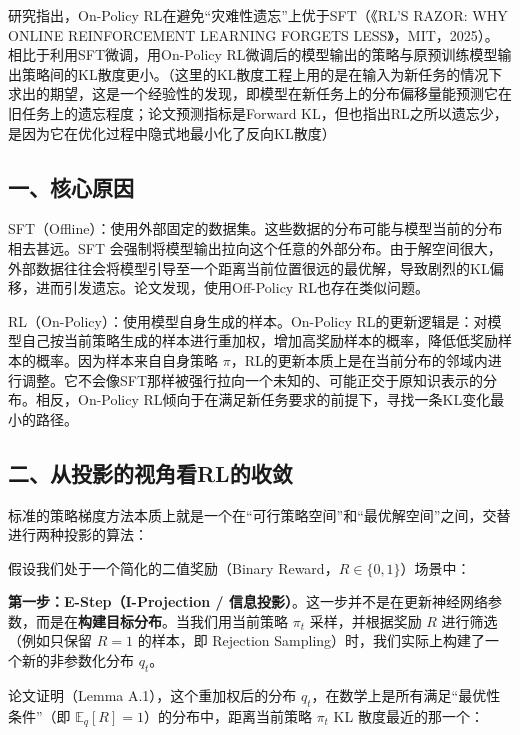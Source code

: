 研究指出，On-Policy RL在避免``灾难性遗忘''上优于SFT（《RL'S RAZOR: WHY ONLINE REINFORCEMENT LEARNING FORGETS LESS》，MIT，2025）。相比于利用SFT微调，用On-Policy RL微调后的模型输出的策略与原预训练模型输出策略间的KL散度更小。（这里的KL散度工程上用的是在输入为新任务的情况下求出的期望，这是一个经验性的发现，即模型在新任务上的分布偏移量能预测它在旧任务上的遗忘程度；论文预测指标是Forward KL，但也指出RL之所以遗忘少，是因为它在优化过程中隐式地最小化了反向KL散度）

\hypertarget{ux4e00ux6838ux5fc3ux539fux56e0}{%
\subsection{一、核心原因}\label{ux4e00ux6838ux5fc3ux539fux56e0}}

SFT（Offline）：使用外部固定的数据集。这些数据的分布可能与模型当前的分布相去甚远。SFT 会强制将模型输出拉向这个任意的外部分布。由于解空间很大，外部数据往往会将模型引导至一个距离当前位置很远的最优解，导致剧烈的KL偏移，进而引发遗忘。论文发现，使用Off-Policy RL也存在类似问题。

RL（On-Policy）：使用模型自身生成的样本。On-Policy RL的更新逻辑是：对模型自己按当前策略生成的样本进行重加权，增加高奖励样本的概率，降低低奖励样本的概率。因为样本来自自身策略 \(\pi\)，RL的更新本质上是在当前分布的邻域内进行调整。它不会像SFT那样被强行拉向一个未知的、可能正交于原知识表示的分布。相反，On-Policy RL倾向于在满足新任务要求的前提下，寻找一条KL变化最小的路径。

\hypertarget{ux4e8cux4eceux6295ux5f71ux7684ux89c6ux89d2ux770brlux7684ux6536ux655b}{%
\subsection{二、从投影的视角看RL的收敛}\label{ux4e8cux4eceux6295ux5f71ux7684ux89c6ux89d2ux770brlux7684ux6536ux655b}}

标准的策略梯度方法本质上就是一个在``可行策略空间''和``最优解空间''之间，交替进行两种投影的算法：

假设我们处于一个简化的二值奖励（Binary Reward，\(R \in \{0,1\}\)）场景中：

\textbf{第一步：E-Step（I-Projection / 信息投影）}。这一步并不是在更新神经网络参数，而是在\textbf{构建目标分布}。当我们用当前策略 \(\pi_t\) 采样，并根据奖励 \(R\) 进行筛选（例如只保留 \(R=1\) 的样本，即 Rejection Sampling）时，我们实际上构建了一个新的非参数化分布 \(q_t\)。

论文证明（Lemma A.1），这个重加权后的分布 \(q_t\)，在数学上是所有满足``最优性条件''（即 \(\mathbb{E}_q[R]=1\)）的分布中，距离当前策略 \(\pi_t\) KL 散度最近的那一个：

